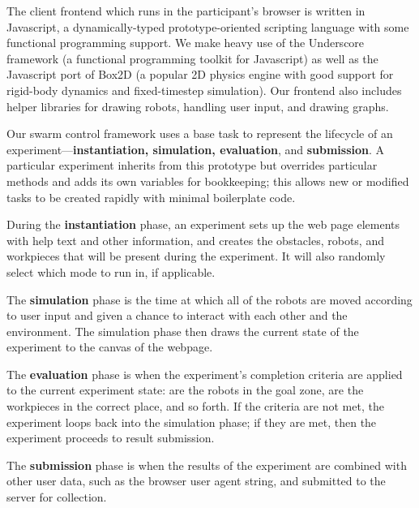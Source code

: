 The client frontend which runs in the participant's browser is written in Javascript, a dynamically-typed prototype-oriented scripting language with some functional programming support. We make heavy use of the Underscore framework (a functional programming toolkit for Javascript) as well as the Javascript port of Box2D (a popular 2D physics engine with good support for rigid-body dynamics and fixed-timestep simulation). Our frontend also includes helper libraries for drawing robots, handling user input, and drawing graphs.

Our swarm control framework uses a base task to represent the lifecycle of an experiment---{\bf  instantiation, simulation, evaluation}, and {\bf submission}. A particular experiment inherits from this prototype but overrides particular methods and adds its own variables for bookkeeping; this allows new or modified tasks to be created rapidly with minimal boilerplate code.

During the {\bf instantiation} phase, an experiment sets up the web page elements with help text and other information, and creates the obstacles, robots, and workpieces that will be present during the experiment. It will also randomly select which mode to run in, if applicable.

The {\bf simulation} phase is the time at which all of the robots are moved according to user input and given a chance to interact with each other and the environment. The simulation phase then draws the current state of the experiment to the canvas of the webpage.

The {\bf evaluation} phase is when the experiment's completion criteria are applied to the current experiment state: are the robots in the goal zone, are the workpieces in the correct place, and so forth. If the criteria are not met, the experiment loops back into the simulation phase; if they are met, then the experiment proceeds to result submission.

The {\bf submission} phase is when the results of the experiment are combined with other user data, such as the browser user agent string, and submitted to the server for collection.


